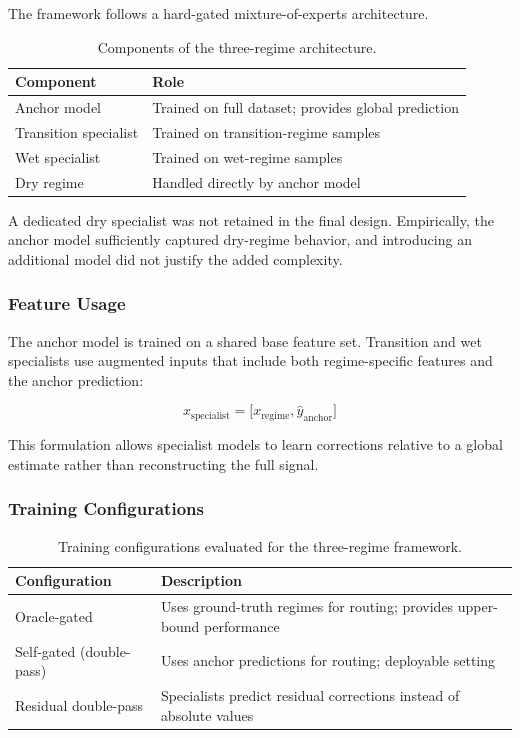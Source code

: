 The framework follows a hard-gated mixture-of-experts \cite{jacobs1991moe} architecture.

\begin{table}[H]
\centering
\begin{tabular}{ll}
\toprule
\textbf{Component} & \textbf{Role} \\
\midrule
Anchor model & Trained on full dataset; provides global prediction \\
Transition specialist & Trained on transition-regime samples \\
Wet specialist & Trained on wet-regime samples \\
Dry regime & Handled directly by anchor model \\
\bottomrule
\end{tabular}
\caption{Components of the three-regime architecture.}
\end{table}

A dedicated dry specialist was not retained in the final design. Empirically, the anchor model sufficiently captured dry-regime behavior, and introducing an additional model did not justify the added complexity.

\subsubsection*{Feature Usage}

The anchor model is trained on a shared base feature set. Transition and wet specialists use augmented inputs that include both regime-specific features and the anchor prediction:

\begin{equation}
x_{\text{specialist}} = \big[x_{\text{regime}}, \hat{y}_{\text{anchor}}\big]
\end{equation}

This formulation allows specialist models to learn corrections relative to a global estimate rather than reconstructing the full signal.

\subsubsection*{Training Configurations}

\begin{table}[H]
\centering
\begin{tabular}{p{4cm} p{9cm}}
\toprule
\textbf{Configuration} & \textbf{Description} \\
\midrule
Oracle-gated & Uses ground-truth regimes for routing; provides upper-bound performance \\
Self-gated (double-pass) & Uses anchor predictions for routing; deployable setting \\
Residual double-pass & Specialists predict residual corrections instead of absolute values \\
\bottomrule
\end{tabular}
\caption{Training configurations evaluated for the three-regime framework.}
\end{table}

